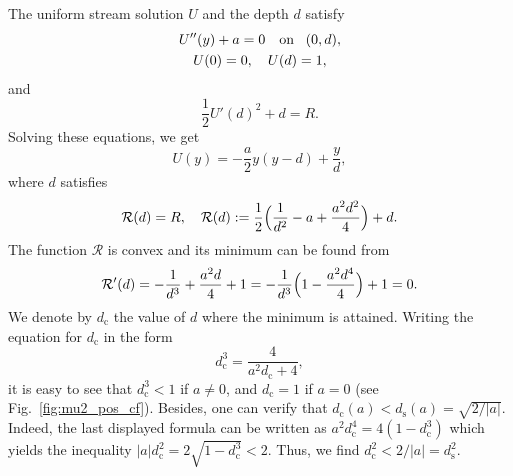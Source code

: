 \documentclass[oneside,a4paper,11pt]{article}
\theoremstyle{thmstyletwo}%
\theoremstyle{thmstylethree}%
\numberwithin{equation}{section}
\def\dcrit{d_{\textrm{c}}}
\def\ds{d_{\textrm{s}}}
\begin{document}
 The uniform stream solution $U$ and the depth $d$ satisfy
\begin{gather*}
U''(y)+a=0\quad\mbox{on\!}\quad (0,d),
\\
U(0)=0,\quad U(d)=1,
\end{gather*}
and
$$
\frac{1}{2}U'(d)^2+d=R.
$$
Solving these equations, we get
\begin{equation}\label{eq:defU}
U(y)=-\frac{a}{2}y(y-d)+\frac{y}{d},
\end{equation}
where $d$ satisfies 
\begin{equation}\label{Ja4a}
\mathcal{R}(d)=R,\quad \mathcal{R}(d):=\frac{1}{2}\Bigl(\frac{1}{d^2}-a+\frac{a^2d^2}{4}\Bigr)+d.
\end{equation}
The function $\mathcal{R}$ is convex and its minimum can be found from
\begin{equation}\label{Ju8b}
\mathcal{R}'(d)=-\frac{1}{d^3}+\frac{a^2d}{4}+1=-\frac{1}{d^3}\Bigl(1-\frac{a^2d^4}{4}\Bigr)+1=0.
\end{equation}
We denote by $\dcrit$ the value of $d$ where the minimum is attained. Writing the equation for $\dcrit$ in the form
\[
\dcrit^3=\frac{4}{a^2\dcrit+4},
\]
it is easy to see that $\dcrit^3<1$ if $a\neq 0$, and $\dcrit=1$ if $a=0$ (see Fig.~\ref{fig:mu2_pos_cf}). Besides, one can verify that $\dcrit(a)<\ds(a)=\sqrt{2/|a|}$. Indeed, the last displayed formula can be written as $a^2 \dcrit^4=4(1-\dcrit^3)$ which yields the inequality $|a| \dcrit^2=2\sqrt{1-\dcrit^3}<2$. Thus, we find $\dcrit^2<2/|a|=\ds^2$.
\end{document}
